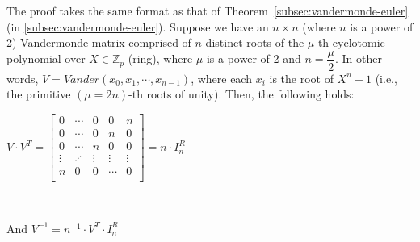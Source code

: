 \begin{tcolorbox}[title={\textbf{\tboxtheorem{\ref*{subsec:vandermonde-euler-integer-ring}} Vandermonde Matrix with Roots of  \text{(power-of-2)}-th Cyclotomic Polynomial over Ring ($\mathbb{Z}_p$)}}]

The proof takes the same format as that of Theorem~\ref*{subsec:vandermonde-euler} (in \autoref{subsec:vandermonde-euler}). Suppose we have an $n \times n$ (where $n$ is a power of 2) Vandermonde matrix comprised of $n$ distinct roots of the $\mu$-th cyclotomic polynomial over $X \in \mathbb{Z}_p$ (ring), where $\mu$ is a power of 2 and $n = \dfrac{\mu}{2}$. In other words, $V = \mathit{Vander}(x_0, x_1, \cdots, x_{n-1})$, where each $x_i$ is the root of $X^n + 1$ (i.e., the primitive $(\mu=2n)$-th roots of unity). Then, the following holds:

$V \cdot V^T = \begin{bmatrix}
0 & \cdots & 0 & 0 & n\\
0 & \cdots & 0 & n & 0\\
0 & \cdots & n & 0 & 0\\
\vdots & \iddots & \vdots & \vdots & \vdots \\
n & 0 & 0 & \cdots & 0\\
\end{bmatrix} = n \cdot I^R_n$

$ $

And $V^{-1} = n^{-1}\cdot V^T \cdot I_n^R$


\end{tcolorbox}
